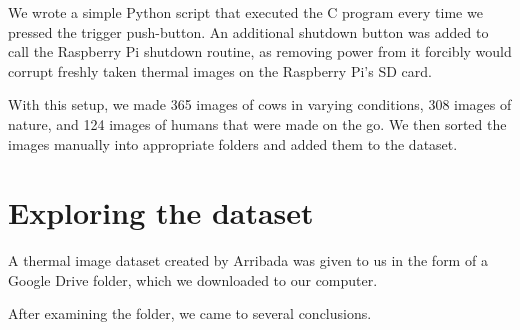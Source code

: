 We wrote a simple Python script that executed the C program every time we pressed the trigger push-button.
An additional shutdown button was added to call the Raspberry Pi shutdown routine, as removing power from it forcibly would corrupt freshly taken thermal images on the Raspberry Pi's SD card.

With this setup, we made 365 images of cows in varying conditions, 308 images of nature, and 124 images of humans that were made on the go.
We then sorted the images manually into appropriate folders and added them to the dataset.


\section{ Exploring the dataset} \label{exploring_dataset}

A thermal image dataset created by Arribada was given to us in the form of a Google Drive folder, which we downloaded to our computer. 

After examining the folder, we came to several conclusions.

